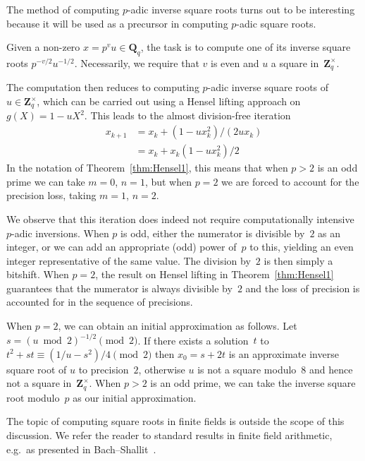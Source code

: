 The method of computing $p$-adic inverse square roots turns out 
to be interesting because it will be used as a precursor in computing 
$p$-adic square roots.

Given a non-zero $x = p^v u \in \mathbf{Q}_q$, the task is to compute 
one of its inverse square roots $p^{-v/2} u^{-1/2}$.  Necessarily, 
we require that $v$ is even and $u$ a square in~$\mathbf{Z}_q^{\times}$.

The computation then reduces to computing $p$-adic inverse square 
roots of $u \in \mathbf{Z}_q^{\times}$, which can be carried out 
using a Hensel lifting approach on $g(X) = 1 - u X^2$.  This leads 
to the almost division-free iteration
\begin{equation}
\begin{split}
x_{k+1} & = x_k + (1 - u x_k^2) / (2 u x_k) \\
        & = x_k + x_k (1 - u x_k^2) / 2
\end{split}
\end{equation}
In the notation of Theorem~\ref{thm:Hensel1}, this means that when 
$p > 2$ is an odd prime we can take $m = 0$, $n = 1$, but when $p = 2$ 
we are forced to account for the precision loss, taking $m = 1$, $n = 2$.

We observe that this iteration does indeed not require computationally 
intensive $p$-adic inversions.  When $p$ is odd, either the numerator 
is divisible by~$2$ as an integer, or we can add an appropriate (odd) 
power of~$p$ to this, yielding an even integer representative of the 
same value.  The division by~$2$ is then simply a bitshift.  When $p = 2$, 
the result on Hensel lifting in Theorem~\ref{thm:Hensel1} guarantees that 
the numerator is always divisible by~$2$ and the loss of precision is 
accounted for in the sequence of precisions.

When $p = 2$, we can obtain an initial approximation as follows. 
Let $s = (u \bmod 2)^{-1/2} \pmod{2}$.  If there exists a solution~$t$ 
to $t^2 + s t \equiv (1/u - s^2) / 4 \pmod{2}$ then $x_0 = s + 2 t$ 
is an approximate inverse square root of $u$ to precision~$2$, 
otherwise $u$ is not a square modulo~$8$ and hence not a square 
in~$\mathbf{Z}_q^{\times}$.  When $p > 2$ is an odd prime, we can 
take the inverse square root modulo~$p$ as our initial approximation.

The topic of computing square roots in finite fields is outside 
the scope of this discussion.  We refer the reader to standard 
results in finite field arithmetic, e.g.\ as presented in 
Bach--Shallit~\citep{Bac96}.

